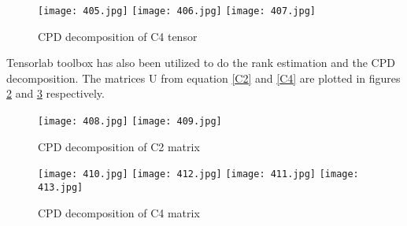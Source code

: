 \begin{figure}[!htbp]
%
\centering
\texttt{[image: 405.jpg]}
\endminipage\hfill
{}%
\centering
\texttt{[image: 406.jpg]}
\endminipage\hfill
{}%
\centering
\texttt{[image: 407.jpg]}
\endminipage\hfill
\caption{CPD decomposition of C4 tensor}\label{C44}
\end{figure}


Tensorlab toolbox has also been utilized to do the rank estimation and the CPD decomposition. The matrices U from equation \ref{C2} and \ref{C4} are plotted in figures \ref{C222} and \ref{C444} respectively.



\begin{figure}[!htbp]
%
\centering
\texttt{[image: 408.jpg]}
\endminipage\hfill
{}%
\centering
\texttt{[image: 409.jpg]}
\endminipage\hfill
\caption{CPD decomposition of C2 matrix}\label{C222}
\end{figure}


\begin{figure}[!htbp]
%
\centering
\texttt{[image: 410.jpg]}
\texttt{[image: 412.jpg]}
\endminipage\hfill
{}%
\centering
\texttt{[image: 411.jpg]}
\texttt{[image: 413.jpg]}
\endminipage\hfill
\caption{CPD decomposition of C4 matrix}\label{C444}
\end{figure}
